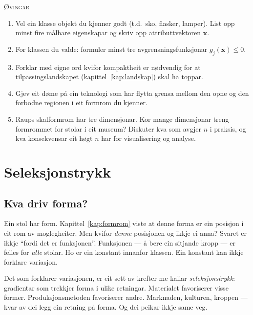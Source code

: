 \documentclass[10pt]{book}
\theoremstyle{definition}
\theoremstyle{plain}
\theoremstyle{remark}
\newenvironment{ovingar}%
  {\medskip\noindent\textsc{\O vingar}\begin{enumerate}[leftmargin=2em]}%
  {\end{enumerate}\medskip}
\begin{document}
\begin{ovingar}
  \item[\textbf{a)}] Vel ein klasse objekt du kjenner godt (t.d.\ sko, flasker, lamper). List opp minst fire m\aa lbare eigenskapar og skriv opp attributtvektoren $\bm{x}$.
  \item[\textbf{a)}] For klassen du valde: formuler minst tre avgrensningsfunksjonar $g_j(\bm{x}) \leq 0$.
  \item[\textbf{b)}] Forklar med eigne ord kvifor kompaktheit er n\o dvendig for at tilpassingslandskapet (kapittel~\ref{kap:landskap}) skal ha toppar.
  \item[\textbf{b)}] Gjev eit d\o me p\aa{} ein teknologi som har flytta grensa mellom den opne og den forbodne regionen i eit formrom du kjenner.
  \item[\textbf{c)}] Raups skalformrom har tre dimensjonar. Kor mange dimensjonar treng formrommet for stolar i eit museum? Diskuter kva som avgjer $n$ i praksis, og kva konsekvensar eit h\o gt $n$ har for visualisering og analyse.
\end{ovingar}


\chapter{Seleksjonstrykk}\label{kap:seleksjon}

\section{Kva driv forma?}\label{sec:seleksjon:intuisjon}

Ein stol har form. Kapittel~\ref{kap:formrom} viste at denne forma er ein posisjon i eit rom av moglegheiter. Men kvifor \emph{denne} posisjonen og ikkje ei anna? Svaret er ikkje ``fordi det er funksjonen''. Funksjonen --- \aa{} bere ein sitjande kropp --- er felles for \emph{alle} stolar. Ho er ein konstant innanfor klassen. Ein konstant kan ikkje forklare variasjon.

Det som forklarer variasjonen, er eit sett av krefter me kallar \emph{seleksjonstrykk}: gradientar som trekkjer forma i ulike retningar. Materialet favoriserer visse former. Produksjonsmetoden favoriserer andre. Marknaden, kulturen, kroppen --- kvar av dei legg ein retning p\aa{} forma. Og dei peikar ikkje same veg.
\end{document}
